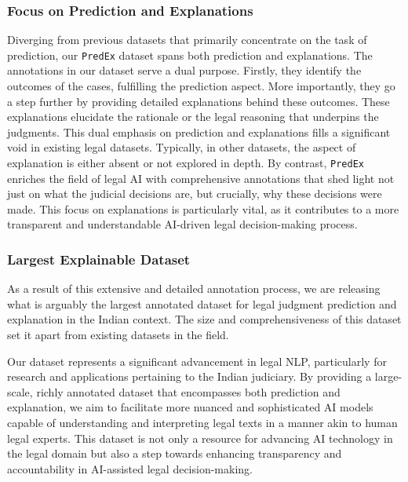\subsubsection{Focus on Prediction and Explanations}
Diverging from previous datasets that primarily concentrate on the task of prediction, our \texttt{PredEx} dataset spans both prediction and explanations. The annotations in our dataset serve a dual purpose. Firstly, they identify the outcomes of the cases, fulfilling the prediction aspect. More importantly, they go a step further by providing detailed explanations behind these outcomes. These explanations elucidate the rationale or the legal reasoning that underpins the judgments. This dual emphasis on prediction and explanations fills a significant void in existing legal datasets. Typically, in other datasets, the aspect of explanation is either absent or not explored in depth. By contrast, \texttt{PredEx} enriches the field of legal AI with comprehensive annotations that shed light not just on what the judicial decisions are, but crucially, why these decisions were made. This focus on explanations is particularly vital, as it contributes to a more transparent and understandable AI-driven legal decision-making process.

\subsubsection{Largest Explainable Dataset} As a result of this extensive and detailed annotation process, we are releasing what is arguably the largest annotated dataset for legal judgment prediction and explanation in the Indian context. The size and comprehensiveness of this dataset set it apart from existing datasets in the field.

Our dataset represents a significant advancement in legal NLP, particularly for research and applications pertaining to the Indian judiciary. By providing a large-scale, richly annotated dataset that encompasses both prediction and explanation, we aim to facilitate more nuanced and sophisticated AI models capable of understanding and interpreting legal texts in a manner akin to human legal experts. This dataset is not only a resource for advancing AI technology in the legal domain but also a step towards enhancing transparency and accountability in AI-assisted legal decision-making. 
